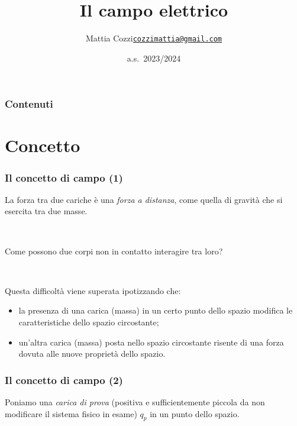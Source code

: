 \documentclass[]{beamer}
\title{Il campo elettrico}
\author{\texorpdfstring{Mattia Cozzi\newline\href{mailto:cozzimattia@gmail.com}{\texttt{cozzimattia@gmail.com}}}{Mattia Cozzi}}
\date{a.s.~2023/2024}
\theoremstyle{plain}
\begin{document}
\begin{frame}
  \titlepage
\end{frame}





\begin{frame}
\frametitle{Contenuti}
\tableofcontents
\end{frame}


\section{Concetto}

\begin{frame}
\frametitle{Il concetto di campo (1)}
La forza tra due cariche è una \emph{forza a distanza}, come quella di gravità che si esercita tra due masse.

~

Come possono due corpi non in contatto interagire tra loro?\pause

~

Questa difficoltà viene superata ipotizzando che:
\begin{itemize}
  \item la presenza di una carica (massa) in un certo punto dello spazio \alert<2>{modifica le caratteristiche dello spazio} circostante;\pause
  \item un'altra carica (massa) posta nello spazio circostante \alert<3>{risente di una forza dovuta alle nuove proprietà dello spazio}.
\end{itemize}
\end{frame}


\begin{frame}
\frametitle{Il concetto di campo (2)}

\begin{figure}
\end{figure}
Poniamo una \emph<1>{carica di prova} (positiva e sufficientemente piccola da non modificare il sistema fisico in esame) $ q_p $ in un punto dello spazio.

~

\end{frame}
\end{document}

